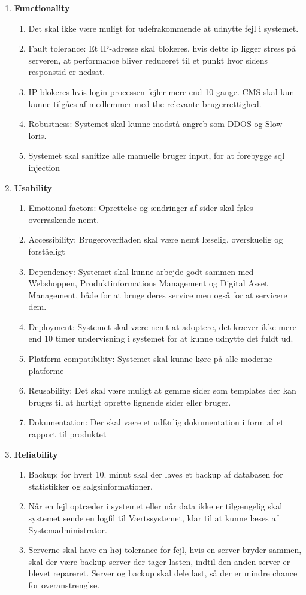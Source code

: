 \begin{enumerate}
\item \textbf{Functionality}
	\begin{enumerate}
	\item Det skal ikke være muligt for udefrakommende at udnytte fejl i systemet. 
	\item Fault tolerance: Et IP-adresse skal blokeres, hvis dette ip ligger stress på serveren, at performance bliver reduceret til et punkt hvor sidens responstid er nedsat.
	\item IP blokeres hvis login processen fejler mere end 10 gange.
	CMS skal kun kunne tilgåes af medlemmer med the relevante brugerrettighed.
	\item Robustness: Systemet skal kunne modstå angreb som DDOS og Slow loris.
	\item Systemet skal sanitize alle manuelle bruger input, for at forebygge sql injection
	\end{enumerate}

\item\textbf{Usability}
	\begin{enumerate}
	\item Emotional factors: Oprettelse og ændringer af sider skal føles overraskende nemt.
	\item Accessibility: Brugeroverfladen skal være nemt læselig, overskuelig og forståeligt
	\item Dependency: Systemet skal kunne arbejde godt sammen med Webshoppen, Produktinformations Management og Digital Asset Management, både for at bruge deres service men også for at servicere dem.
	\item Deployment: Systemet skal være nemt at adoptere, det kræver ikke mere end 10 timer undervisning i systemet 	for at kunne udnytte det fuldt ud. 
	\item Platform compatibility: Systemet skal kunne køre på alle moderne platforme
	\item Reusability: Det skal være muligt at gemme sider som templates der kan bruges til at hurtigt oprette 	lignende sider eller bruger.
	\item Dokumentation: Der skal være et udførlig dokumentation i form af et rapport til produktet
	\end{enumerate}

\item \textbf{Reliability}
	\begin{enumerate}
	\item Backup: for hvert 10. minut skal der laves et backup af databasen for statistikker og salgsinformationer.
	\item Når en fejl optræder i systemet eller når data ikke er tilgængelig skal systemet sende en logfil til Værtssystemet, klar til at kunne læses af Systemadministrator.
	\item Serverne skal have en høj tolerance for fejl, hvis en server bryder sammen, skal der være backup server der tager lasten, indtil den anden server er blevet repareret. Server og backup skal dele last, så der er mindre chance for overanstrenglse.
	\end{enumerate}


\end{enumerate}
